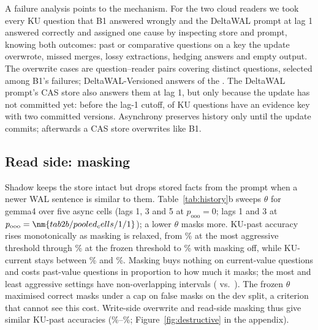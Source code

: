 A failure analysis points to the mechanism. For the two cloud readers we took every KU question that B1 answered wrongly and the DeltaWAL prompt at lag 1 answered correctly and assigned one cause by inspecting store and prompt, knowing both outcomes:  past or comparative questions on a key the update overwrote,  missed merges,  lossy extractions,  hedging answers and  empty output. The overwrite cases are question--reader pairs covering  distinct questions, selected among B1's failures; DeltaWAL-Versioned answers  of the . The DeltaWAL prompt's CAS store also answers them at lag 1, but only because the update has not committed yet: before the lag-1 cutoff,  of  KU questions have an evidence key with two committed versions. Asynchrony preserves history only until the update commits; afterwards a CAS store overwrites like B1.

\subsection{Read side: masking}
\label{sec:hist-read}

Shadow keeps the store intact but drops stored facts from the prompt when a newer WAL sentence is similar to them. Table~\ref{tab:history}b sweeps $\theta$ for gemma4 over five async cells (lags 1, 3 and 5 at $p_\text{ooo}=0$; lags 1 and 3 at $p_\text{ooo}=\nm{tab2b/pooled_cells/1/1}$); a lower $\theta$ masks more. KU-past accuracy rises monotonically as masking is relaxed, from \% at the most aggressive threshold through \% at the frozen threshold to \% with masking off, while KU-current stays between \% and \%. Masking buys nothing on current-value questions and costs past-value questions in proportion to how much it masks; the most and least aggressive settings have non-overlapping intervals ( vs.\ ). The frozen $\theta$ maximised correct masks under a cap on false masks on the dev split, a criterion that cannot see this cost. Write-side overwrite and read-side masking thus give similar KU-past accuracies (\%--\%; Figure~\ref{fig:destructive} in the appendix).


